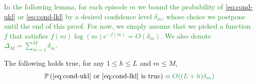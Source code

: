 \documentclass[runningheads]{llncs}
\newcommand{\diff}[1]{\textcolor{ForestGreen}{#1}}
\begin{document}
\diff{In the following lemma, for each episode $m$ we bound the probability of \eqref{eq:cond-ukl} or \eqref{eq:cond-lkl} by a desired confidence level $\delta_m$, whose choice we postpone until the end of this proof. For now, we simply assume that we picked a function $f$ that satisfies $f(m)\log (m) e^{-f(m)} = O(\delta_m)$. We also denote $\Delta_M = \sum_{m=1}^{M}\delta_m$.}

\begin{lemma}
\label{lemma:boundary-crossing-prob}
The following holds true, for any $1 \leq h \leq L$ and $m \leq M$,
\begin{equation*}
    \probability{\text{\eqref{eq:cond-ukl} or \eqref{eq:cond-lkl} is true}} = \diff{O((L+h)\delta_m)}
\end{equation*}
\end{lemma}
\end{document}
